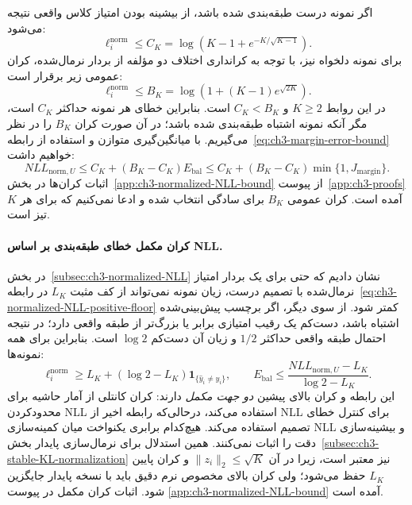 اگر نمونه درست طبقه‌بندی شده باشد، از بیشینه بودن امتیاز کلاس واقعی نتیجه می‌شود:
\begin{equation}\label{eq:ch3-normalized-correct-bound}
\ell_i^{\mathrm{norm}}\le
C_K=\log\left(K-1+e^{-K/\sqrt{K-1}}\right).
\end{equation}
برای نمونه دلخواه نیز، با توجه به کرانداری اختلاف دو مؤلفه از بردار نرمال‌شده، کران عمومی زیر برقرار است:
\begin{equation}\label{eq:ch3-normalized-global-bound}
\ell_i^{\mathrm{norm}}\le
B_K=\log\left(1+(K-1)e^{\sqrt{2K}}\right).
\end{equation}
در این روابط $K\ge2$ و $C_K<B_K$ است. بنابراین خطای هر نمونه حداکثر $C_K$ است، مگر آنکه نمونه اشتباه طبقه‌بندی شده باشد؛ در آن صورت کران $B_K$ را در نظر می‌گیریم. با میانگین‌گیری متوازن و استفاده از رابطه~\eqref{eq:ch3-margin-error-bound} خواهیم داشت:
\begin{equation}\label{eq:ch3-normalized-NLL-margin-bound}
\boxed{
NLL_{\mathrm{norm},U}
\le C_K+(B_K-C_K)E_{\mathrm{bal}}
\le C_K+(B_K-C_K)\min\{1,J_{\mathrm{margin}}\}.}
\end{equation}
اثبات کران‌ها در بخش~\ref{app:ch3-normalized-NLL-bound} از پیوست~\ref{app:ch3-proofs} آمده است. کران عمومی $B_K$ برای سادگی انتخاب شده و ادعا نمی‌کنیم که برای هر $K$ تیز است.


\paragraph{کران مکمل خطای طبقه‌بندی بر اساس NLL.}
در بخش~\ref{subsec:ch3-normalized-NLL}
نشان دادیم که حتی برای یک
بردار امتیاز نرمال‌شده با تصمیم درست،
زیان نمونه نمی‌تواند از کف مثبت
$L_K$ در
رابطه~\eqref{eq:ch3-normalized-NLL-positive-floor}
کمتر شود. از سوی دیگر،
اگر برچسب پیش‌بینی‌شده اشتباه باشد،
دست‌کم یک رقیب امتیازی برابر یا
بزرگ‌تر از طبقه واقعی دارد؛
در نتیجه احتمال طبقه واقعی حداکثر
$1/2$ و زیان آن دست‌کم $\log2$ است.
بنابراین برای همه نمونه‌ها:
\begin{equation}\label{eq:ch3-normalized-NLL-error-lower-bound}
\boxed{
\ell_i^{\mathrm{norm}}
\ge L_K+
(\log2-L_K)\mathbf1_{\{\widehat y_i\ne y_i\}},
\qquad
E_{\mathrm{bal}}\le
\frac{NLL_{\mathrm{norm},U}-L_K}{\log2-L_K}.
}
\end{equation}
این رابطه و کران بالای پیشین
\emph{دو جهت مکمل} دارند:
کران کانتلی از آمار حاشیه
برای محدودکردن NLL استفاده می‌کند،
درحالی‌که رابطه اخیر از NLL
برای کنترل خطای تصمیم استفاده
می‌کند. هیچ‌کدام برابری یکنواخت
میان کمینه‌سازی NLL و
بیشینه‌سازی دقت را اثبات نمی‌کنند.
همین استدلال برای نرمال‌سازی
پایدار بخش~\ref{subsec:ch3-stable-KL-normalization}
نیز معتبر است، زیرا در آن
$\|z_i\|_2\le\sqrt K$ و
کران پایین $L_K$ حفظ می‌شود؛
ولی کران بالای مخصوص نرم
دقیق باید با نسخه پایدار
جایگزین شود. اثبات کران مکمل
در پیوست
\ref{app:ch3-normalized-NLL-bound}
آمده است.

